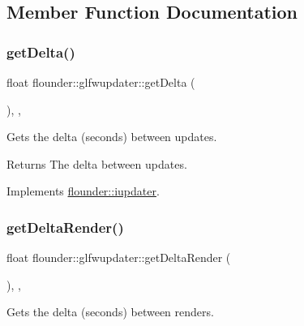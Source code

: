 \subsection{Member Function Documentation}
\mbox{\label{classflounder_1_1glfwupdater_adfe51aba1c2ac7c79d385eed15c901fc}} 
\subsubsection{\texorpdfstring{get\+Delta()}{getDelta()}}
{\footnotesize\ttfamily float flounder\+::glfwupdater\+::get\+Delta (\begin{DoxyParamCaption}{ }\end{DoxyParamCaption})\hspace{0.3cm}{\ttfamily [inline]}, {\ttfamily [override]}, {\ttfamily [virtual]}}



Gets the delta (seconds) between updates. 

\begin{DoxyReturn}{Returns}
The delta between updates. 
\end{DoxyReturn}


Implements \hyperlink{classflounder_1_1iupdater_a1a3813366f3a4f08cb91e23cd7b63cda}{flounder\+::iupdater}.

\mbox{\label{classflounder_1_1glfwupdater_aad1dda11a40273c2a18e7974f42f59dc}} 
\subsubsection{\texorpdfstring{get\+Delta\+Render()}{getDeltaRender()}}
{\footnotesize\ttfamily float flounder\+::glfwupdater\+::get\+Delta\+Render (\begin{DoxyParamCaption}{ }\end{DoxyParamCaption})\hspace{0.3cm}{\ttfamily [inline]}, {\ttfamily [override]}, {\ttfamily [virtual]}}



Gets the delta (seconds) between renders. 

